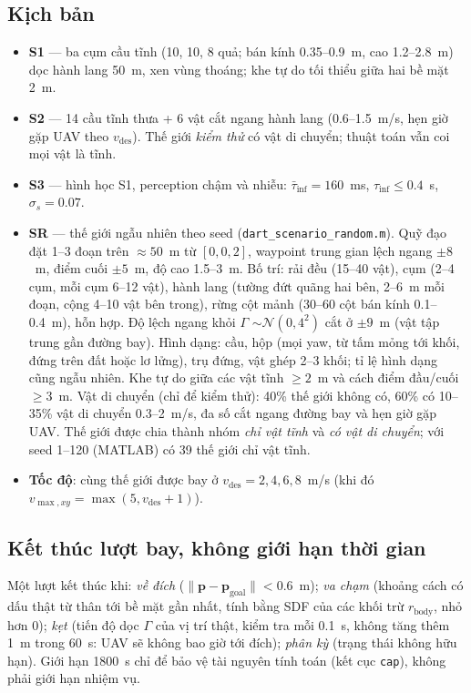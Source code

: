 \documentclass[11pt,a4paper]{article}
\numberwithin{equation}{section}
\newcommand{\vb}[1]{\bm{#1}}
\newcommand{\code}[1]{\texttt{\small #1}}
\theoremstyle{definition}
\theoremstyle{plain}
\theoremstyle{remark}
\begin{document}
\subsection{Kịch bản}
\begin{itemize}
\item \textbf{S1} --- ba cụm cầu tĩnh (10, 10, 8 quả; bán kính 0.35--0.9~m, cao 1.2--2.8~m) dọc hành lang 50~m, xen vùng thoáng; khe tự do tối thiểu giữa hai bề mặt 2~m.
\item \textbf{S2} --- 14 cầu tĩnh thưa + 6 vật cắt ngang hành lang (0.6--1.5~m/s, hẹn giờ gặp UAV theo $v_{\text{des}}$). Thế giới \emph{kiểm thử} có vật di chuyển; thuật toán vẫn coi mọi vật là tĩnh.
\item \textbf{S3} --- hình học S1, perception chậm và nhiễu: $\bar\tau_{\text{inf}}=160$~ms, $\tau_{\text{inf}}\le0.4$~s, $\sigma_s=0.07$.
\item \textbf{SR} --- thế giới ngẫu nhiên theo seed (\code{dart\_scenario\_random.m}). Quỹ đạo đặt 1--3 đoạn trên $\approx50$~m từ $[0,0,2]$, waypoint trung gian lệch ngang $\pm8$~m, điểm cuối $\pm5$~m, độ cao 1.5--3~m. Bố trí: rải đều (15--40 vật), cụm (2--4 cụm, mỗi cụm 6--12 vật), hành lang (tường đứt quãng hai bên, 2--6~m mỗi đoạn, cộng 4--10 vật bên trong), rừng cột mảnh (30--60 cột bán kính 0.1--0.4~m), hỗn hợp. Độ lệch ngang khỏi $\Gamma$ $\sim\mathcal N(0,4^2)$ cắt ở $\pm9$~m (vật tập trung gần đường bay). Hình dạng: cầu, hộp (mọi yaw, từ tấm mỏng tới khối, đứng trên đất hoặc lơ lửng), trụ đứng, vật ghép 2--3 khối; tỉ lệ hình dạng cũng ngẫu nhiên. Khe tự do giữa các vật tĩnh $\ge2$~m và cách điểm đầu/cuối $\ge3$~m. Vật di chuyển (chỉ để kiểm thử): 40\% thế giới không có, 60\% có 10--35\% vật di chuyển 0.3--2~m/s, đa số cắt ngang đường bay và hẹn giờ gặp UAV. Thế giới được chia thành nhóm \emph{chỉ vật tĩnh} và \emph{có vật di chuyển}; với seed 1--120 (MATLAB) có 39 thế giới chỉ vật tĩnh.
\item \textbf{Tốc độ}: cùng thế giới được bay ở $v_{\text{des}}=2,4,6,8$~m/s (khi đó $v_{\max,xy}=\max(5,v_{\text{des}}+1)$).
\end{itemize}

\subsection{Kết thúc lượt bay, không giới hạn thời gian}
\label{sec:termination}
Một lượt kết thúc khi: \emph{về đích} ($\|\vb p-\vb p_{\text{goal}}\|<0.6$~m); \emph{va chạm} (khoảng cách có dấu thật từ thân tới bề mặt gần nhất, tính bằng SDF của các khối trừ $r_{\text{body}}$, nhỏ hơn 0); \emph{kẹt} (tiến độ dọc $\Gamma$ của vị trí thật, kiểm tra mỗi 0.1~s, không tăng thêm 1~m trong 60~s: UAV sẽ không bao giờ tới đích); \emph{phân kỳ} (trạng thái không hữu hạn). Giới hạn 1800~s chỉ để bảo vệ tài nguyên tính toán (kết cục \code{cap}), không phải giới hạn nhiệm vụ.
\end{document}
